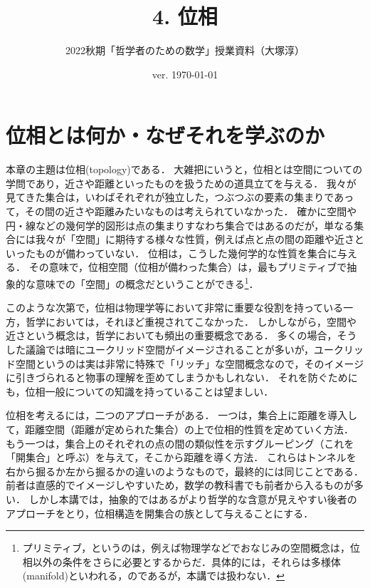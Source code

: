 \documentclass[11pt,a4paper]{jsarticle}
\begin{document}
\title{4. 位相}
\author{2022秋期「哲学者のための数学」授業資料（大塚淳）}
\date{ver. \today}
\maketitle

\section{位相とは何か・なぜそれを学ぶのか}

本章の主題は位相(topology)である．
大雑把にいうと，位相とは空間についての学問であり，近さや距離といったものを扱うための道具立てを与える．
我々が見てきた集合は，いわばそれぞれが独立した，つぶつぶの要素の集まりであって，その間の近さや距離みたいなものは考えられていなかった．
確かに空間や円・線などの幾何学的図形は点の集まりすなわち集合ではあるのだが，単なる集合には我々が「空間」に期待する様々な性質，例えば点と点の間の距離や近さといったものが備わっていない．
位相は，こうした幾何学的な性質を集合に与える．
その意味で，位相空間（位相が備わった集合）は，最もプリミティブで抽象的な意味での「空間」の概念だということができる\footnote{プリミティブ，というのは，例えば物理学などでおなじみの空間概念は，位相以外の条件をさらに必要とするからだ．具体的には，それらは多様体(manifold)といわれる，のであるが，本講では扱わない．}．

このような次第で，位相は物理学等において非常に重要な役割を持っている一方，哲学においては，それほど重視されてこなかった．
しかしながら，空間や近さという概念は，哲学においても頻出の重要概念である．
多くの場合，そうした議論では暗にユークリッド空間がイメージされることが多いが，ユークリッド空間というのは実は非常に特殊で「リッチ」な空間概念なので，そのイメージに引きづられると物事の理解を歪めてしまうかもしれない．
それを防ぐためにも，位相一般についての知識を持っていることは望ましい．

位相を考えるには，二つのアプローチがある．
一つは，集合上に距離を導入して，距離空間（距離が定められた集合）の上で位相的性質を定めていく方法．
もう一つは，集合上のそれぞれの点の間の類似性を示すグルーピング（これを「開集合」と呼ぶ）を与えて，そこから距離を導く方法．
これらはトンネルを右から掘るか左から掘るかの違いのようなもので，最終的には同じことである．
前者は直感的でイメージしやすいため，数学の教科書でも前者から入るものが多い．
しかし本講では，抽象的ではあるがより哲学的な含意が見えやすい後者のアプローチをとり，位相構造を開集合の族として与えることにする．

\end{document}
